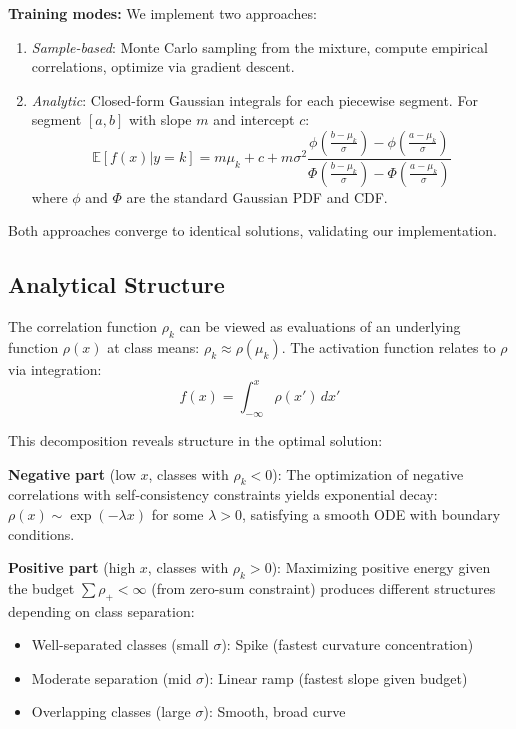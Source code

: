 \documentclass{article}
\begin{document}
\textbf{Training modes:} We implement two approaches:
\begin{enumerate}
\item \textit{Sample-based}: Monte Carlo sampling from the mixture, compute empirical correlations, optimize via gradient descent.
\item \textit{Analytic}: Closed-form Gaussian integrals for each piecewise segment. For segment $[a,b]$ with slope $m$ and intercept $c$:
\begin{equation}
\mathbb{E}[f(x) | y=k] = m \mu_k + c + m \sigma^2 \frac{\phi\left(\frac{b-\mu_k}{\sigma}\right) - \phi\left(\frac{a-\mu_k}{\sigma}\right)}{\Phi\left(\frac{b-\mu_k}{\sigma}\right) - \Phi\left(\frac{a-\mu_k}{\sigma}\right)}
\end{equation}
where $\phi$ and $\Phi$ are the standard Gaussian PDF and CDF.
\end{enumerate}

Both approaches converge to identical solutions, validating our implementation.

\subsection{Analytical Structure}

The correlation function $\rho_k$ can be viewed as evaluations of an underlying function $\rho(x)$ at class means: $\rho_k \approx \rho(\mu_k)$. The activation function relates to $\rho$ via integration:
\begin{equation}
f(x) = \int_{-\infty}^x \rho(x') \, dx'
\end{equation}

This decomposition reveals structure in the optimal solution:

\textbf{Negative part} (low $x$, classes with $\rho_k < 0$): The optimization of negative correlations with self-consistency constraints yields exponential decay: $\rho(x) \sim \exp(-\lambda x)$ for some $\lambda > 0$, satisfying a smooth ODE with boundary conditions.

\textbf{Positive part} (high $x$, classes with $\rho_k > 0$): Maximizing positive energy given the budget $\sum \rho_+ < \infty$ (from zero-sum constraint) produces different structures depending on class separation:
\begin{itemize}
\item Well-separated classes (small $\sigma$): Spike (fastest curvature concentration)
\item Moderate separation (mid $\sigma$): Linear ramp (fastest slope given budget)
\item Overlapping classes (large $\sigma$): Smooth, broad curve
\end{itemize}
\end{document}
